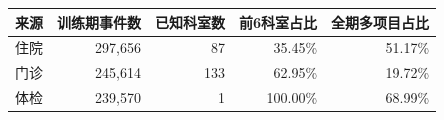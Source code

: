 \begin{tabular}{lrrrr}
\toprule
来源 & 训练期事件数 & 已知科室数 & 前6科室占比 & 全期多项目占比 \\
\midrule
住院 & 297,656 & 87 & 35.45\% & 51.17\% \\
门诊 & 245,614 & 133 & 62.95\% & 19.72\% \\
体检 & 239,570 & 1 & 100.00\% & 68.99\% \\
\bottomrule
\end{tabular}
